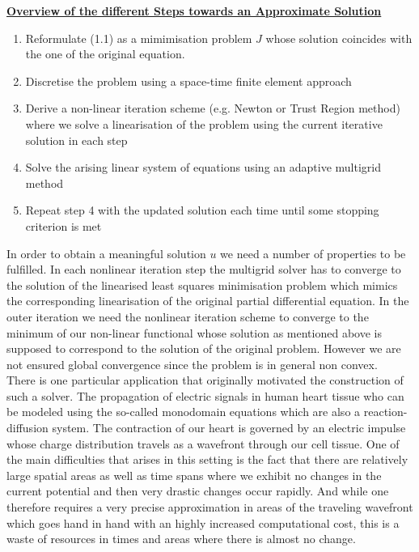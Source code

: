\documentclass[../draft_1.tex]{subfiles}
\begin{document}
\begin{framed}
	\underline{\textbf{Overview of the different Steps towards an Approximate Solution}} 
	
	\begin{enumerate}
		\item  Reformulate (1.1) as a mimimisation problem $J$ whose solution coincides with the one of the original equation. 
		\item Discretise the problem using a space-time finite element approach
		\item Derive a non-linear iteration scheme (e.g. Newton or Trust Region method) where we solve a linearisation of the problem using the current iterative solution in each step
		\item  Solve the arising linear system of equations using an adaptive multigrid method
		\item Repeat step 4 with the updated solution each time until some stopping criterion is met 
	\end{enumerate}	
\end{framed}

In order to obtain a meaningful solution $u$ we need a number of properties to be fulfilled. In each nonlinear iteration step the multigrid solver has to converge to the solution of the linearised least squares minimisation problem which mimics the corresponding linearisation of the original partial differential equation. In the outer iteration we need the nonlinear iteration scheme to converge to the minimum of our non-linear functional whose solution as mentioned above is supposed to correspond to the solution of the original problem. However we are not ensured global convergence since the problem is in general non convex.
\bigskip
\\
There is one particular application that originally motivated the construction of such a solver. The propagation of electric signals in human heart tissue who can be modeled using the so-called monodomain equations which are also a reaction-diffusion system. The contraction of our heart is governed by an electric impulse whose charge distribution travels as a wavefront through our cell tissue. One of the main difficulties that arises in this setting is the fact that there are relatively large spatial areas as well as time spans where we exhibit no changes in the current potential and then very drastic changes occur rapidly. And while one therefore requires a very precise approximation in areas of the traveling wavefront which goes hand in hand with an highly increased computational cost, this is a waste of resources in times and areas where there is almost no change. 
\end{document}
